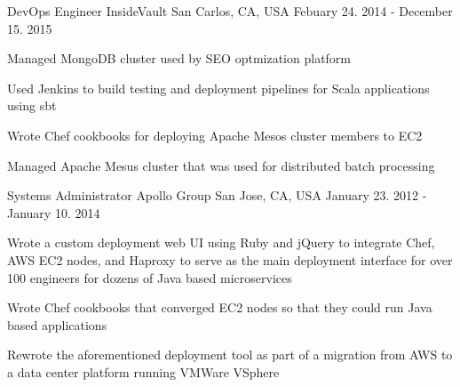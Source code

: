 \begin{cventries}
  \cventry
    {DevOps Engineer} %
    {InsideVault} %
    {San Carlos, CA, USA} %
    {Febuary 24. 2014 - December 15. 2015} %
    {
      \begin{cvitems}
        \item {Managed MongoDB cluster used by SEO optmization platform}
        \item {Used Jenkins to build testing and deployment pipelines for Scala applications using sbt}
        \item {Wrote Chef cookbooks for deploying Apache Mesos cluster members to EC2}
        \item {Managed Apache Mesus cluster that was used for distributed batch processing}
      \end{cvitems}
    }
  \cventry
    {Systems Administrator} %
    {Apollo Group} %
    {San Jose, CA, USA} %
    {January 23. 2012 - January 10. 2014} %
    {
      \begin{cvitems} %
        \item {Wrote a custom deployment web UI using Ruby and jQuery to integrate Chef, AWS EC2 nodes, and Haproxy to serve as the main deployment interface for over 100 engineers for dozens of Java based microservices}
        \item {Wrote Chef cookbooks that converged EC2 nodes so that they could run Java based applications}
        \item {Rewrote the aforementioned deployment tool as part of a migration from AWS to a data center platform running VMWare VSphere}
      \end{cvitems}
    }
\end{cventries}
